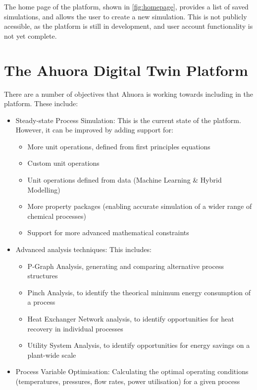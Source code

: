 \documentclass[12pt]{report}
\begin{document}
The home page of the platform, shown in \cref{fig:homepage}, provides a list of saved simulations, and allows the user to create a new simulation. This is not publicly acessible, as the platform is still in development, and user account functionality is not yet complete.

\section{The Ahuora Digital Twin Platform}

There are a number of objectives that Ahuora is working towards including in the platform. These include:

\begin{itemize}
    \item Steady-state Process Simulation: This is the current state of the platform. However, it can be improved by adding support for:
          \begin{itemize}
              \item More unit operations, defined from first principles equations
              \item Custom unit operations
              \item Unit operations defined from data (Machine Learning \& Hybrid Modelling)
              \item More property packages (enabling accurate simulation of a wider range of chemical processes)
              \item Support for more advanced mathematical constraints
          \end{itemize}
    \item Advanced analysis techniques: This includes:
          \begin{itemize}
              \item P-Graph Analysis, generating and comparing alternative process structures
              \item Pinch Analysis, to identify the theorical minimum energy consumption of a process
              \item Heat Exchanger Network analysis, to identify opportunities for heat recovery in individual processes
              \item Utility System Analysis, to identify opportunities for energy savings on a plant-wide scale
          \end{itemize}
    \item Process Variable Optimisation: Calculating the optimal operating conditions (temperatures, pressures, flow rates, power utilisation) for a given process

\end{itemize}
\end{document}
